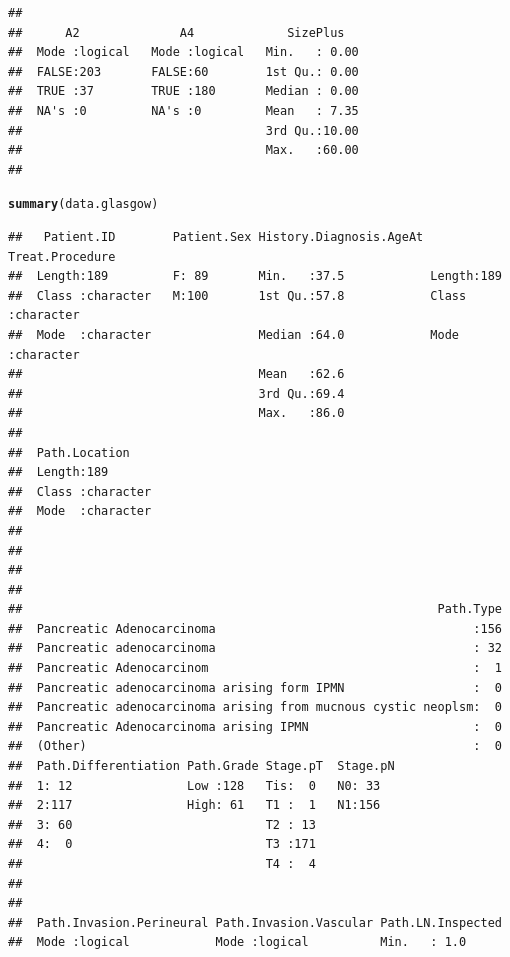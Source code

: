 \documentclass{article}\usepackage[]{graphicx}\usepackage[]{color}
\makeatletter
\newcommand{\hlstd}[1]{\textcolor[rgb]{0.345,0.345,0.345}{#1}}%
\newcommand{\hlkwd}[1]{\textcolor[rgb]{0.737,0.353,0.396}{\textbf{#1}}}%
\newenvironment{kframe}{%
 \def\at@end@of@kframe{}%
 \ifinner\ifhmode%
  \def\at@end@of@kframe{\end{minipage}}%
  \begin{minipage}{\columnwidth}%
 \fi\fi%
 \def\FrameCommand##1{\hskip\@totalleftmargin \hskip-\fboxsep
 \colorbox{shadecolor}{##1}\hskip-\fboxsep
     \hskip-\linewidth \hskip-\@totalleftmargin \hskip\columnwidth}%
 \MakeFramed {\advance\hsize-\width
   \@totalleftmargin\z@ \linewidth\hsize
   \@setminipage}}%
 {\par\unskip\endMakeFramed%
 \at@end@of@kframe}
\newenvironment{knitrout}{}{} %
\makeatother
\begin{document}
\begin{knitrout}
\begin{kframe}
\begin{verbatim}
##                                                                   
##      A2              A4             SizePlus    
##  Mode :logical   Mode :logical   Min.   : 0.00  
##  FALSE:203       FALSE:60        1st Qu.: 0.00  
##  TRUE :37        TRUE :180       Median : 0.00  
##  NA's :0         NA's :0         Mean   : 7.35  
##                                  3rd Qu.:10.00  
##                                  Max.   :60.00  
## 
\end{verbatim}
\begin{alltt}
\hlkwd{summary}\hlstd{(data.glasgow)}
\end{alltt}
\begin{verbatim}
##   Patient.ID        Patient.Sex History.Diagnosis.AgeAt Treat.Procedure   
##  Length:189         F: 89       Min.   :37.5            Length:189        
##  Class :character   M:100       1st Qu.:57.8            Class :character  
##  Mode  :character               Median :64.0            Mode  :character  
##                                 Mean   :62.6                              
##                                 3rd Qu.:69.4                              
##                                 Max.   :86.0                              
##                                                                           
##  Path.Location     
##  Length:189        
##  Class :character  
##  Mode  :character  
##                    
##                    
##                    
##                    
##                                                          Path.Type  
##  Pancreatic Adenocarcinoma                                    :156  
##  Pancreatic adenocarcinoma                                    : 32  
##  Pancreatic Adenocarcinom                                     :  1  
##  Pancreatic adenocarcinoma arising form IPMN                  :  0  
##  Pancreatic adenocarcinoma arising from mucnous cystic neoplsm:  0  
##  Pancreatic Adenocarcinoma arising IPMN                       :  0  
##  (Other)                                                      :  0  
##  Path.Differentiation Path.Grade Stage.pT  Stage.pN
##  1: 12                Low :128   Tis:  0   N0: 33  
##  2:117                High: 61   T1 :  1   N1:156  
##  3: 60                           T2 : 13           
##  4:  0                           T3 :171           
##                                  T4 :  4           
##                                                    
##                                                    
##  Path.Invasion.Perineural Path.Invasion.Vascular Path.LN.Inspected
##  Mode :logical            Mode :logical          Min.   : 1.0     

\end{verbatim}
\end{kframe}
\end{knitrout}
\end{document}
